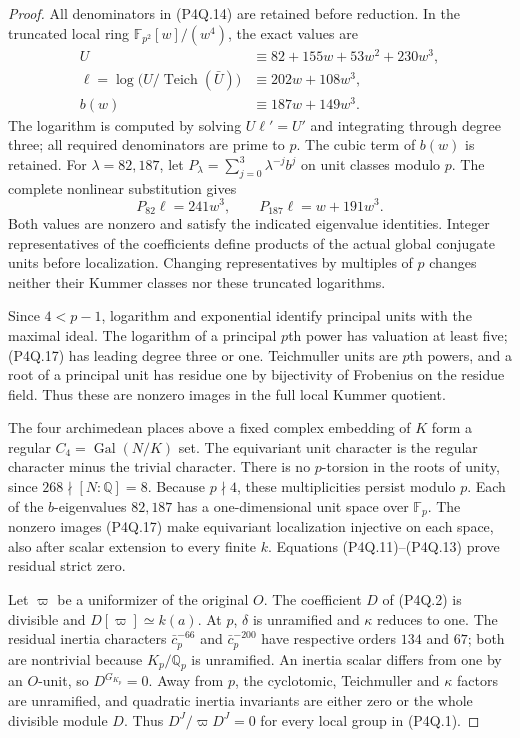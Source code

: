 \begin{proof}
All denominators in (P4Q.14) are retained before reduction.
In the truncated local ring $\mathbb F_{p^2}[w]/(w^4)$,
the exact values are
\[
 \begin{aligned}
 U&\equiv82+155w+53w^2+230w^3,\\
 \ell=\log\bigl(U/\operatorname{Teich}(\bar U)\bigr)
      &\equiv202w+108w^3,\\
 b(w)&\equiv187w+149w^3.
 \end{aligned}
 \tag{P4Q.16}
\]
The logarithm is computed by solving $U\ell'=U'$ and integrating
through degree three; all required denominators are prime to $p$.
The cubic term of $b(w)$ is retained.
For $\lambda=82,187$, let
$P_\lambda=\sum_{j=0}^3\lambda^{-j}b^j$ on unit classes modulo $p$.
The complete nonlinear substitution gives
\[
                 P_{82}\ell=241w^3,
        \qquad P_{187}\ell=w+191w^3.
 \tag{P4Q.17}
\]
Both values are nonzero and satisfy the indicated eigenvalue
identities.  Integer representatives of the coefficients define
products of the actual global conjugate units before localization.
Changing representatives by multiples of $p$ changes neither
their Kummer classes nor these truncated logarithms.

Since $4<p-1$, logarithm and exponential identify principal
units with the maximal ideal.  The logarithm of a principal
$p$th power has valuation at least five; (P4Q.17) has leading
degree three or one.  Teichmuller units are $p$th powers, and a
root of a principal unit has residue one by bijectivity of
Frobenius on the residue field.
Thus these are nonzero images in the full local Kummer quotient.

The four archimedean places above a fixed complex embedding of
$K$ form a regular $C_4=\operatorname{Gal}(N/K)$ set.
The equivariant unit character is the regular character minus
the trivial character.  There is no $p$-torsion in the roots of
unity, since $268\nmid[N:\mathbb Q]=8$.
Because $p\nmid4$, these multiplicities persist modulo $p$.
Each of the $b$-eigenvalues $82,187$ has a one-dimensional unit
space over $\mathbb F_p$.
The nonzero images (P4Q.17) make equivariant localization injective
on each space, also after scalar extension to every finite $k$.
Equations (P4Q.11)--(P4Q.13) prove residual strict zero.

Let $\varpi$ be a uniformizer of the original $O$.
The coefficient $D$ of (P4Q.2) is divisible and
$D[\varpi]\simeq k(a)$.
At $p$, $\delta$ is unramified and $\kappa$ reduces to one.
The residual inertia characters $\bar c_p^{-66}$ and
$\bar c_p^{-200}$ have respective orders $134$ and $67$;
both are nontrivial because $K_p/\mathbb Q_p$ is unramified.
An inertia scalar differs from one by an $O$-unit, so
$D^{G_{K_p}}=0$.
Away from $p$, the cyclotomic, Teichmuller and $\kappa$ factors
are unramified, and quadratic inertia invariants are either
zero or the whole divisible module $D$.
Thus $D^J/\varpi D^J=0$ for every local group in (P4Q.1).


\end{proof}
